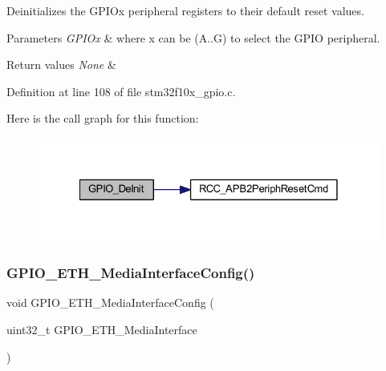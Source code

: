 Deinitializes the G\+P\+I\+Ox peripheral registers to their default reset values. 


\begin{DoxyParams}{Parameters}
{\em G\+P\+I\+Ox} & where x can be (A..G) to select the G\+P\+IO peripheral. \\
\hline
\end{DoxyParams}

\begin{DoxyRetVals}{Return values}
{\em None} & \\
\hline
\end{DoxyRetVals}


Definition at line 108 of file stm32f10x\+\_\+gpio.\+c.

Here is the call graph for this function\+:
\nopagebreak
\begin{figure}[H]
\begin{center}
\leavevmode
\includegraphics[width=328pt]{group___g_p_i_o___exported___functions_gaa60bdf3182c44b5fa818f237042f52ee_cgraph}
\end{center}
\end{figure}
\mbox{\label{group___g_p_i_o___exported___functions_gacbfad958f684347be0f2c762dc85c3c2}} 
\subsubsection{\texorpdfstring{G\+P\+I\+O\+\_\+\+E\+T\+H\+\_\+\+Media\+Interface\+Config()}{GPIO\_ETH\_MediaInterfaceConfig()}}
{\footnotesize\ttfamily void G\+P\+I\+O\+\_\+\+E\+T\+H\+\_\+\+Media\+Interface\+Config (\begin{DoxyParamCaption}\item[{uint32\+\_\+t}]{G\+P\+I\+O\+\_\+\+E\+T\+H\+\_\+\+Media\+Interface }\end{DoxyParamCaption})}




